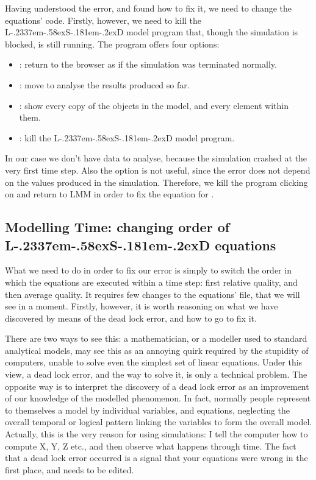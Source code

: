\documentclass [11pt,a4paper] {book}
\def\LsD{{L\kern-.2337em\lower-.58ex\hbox{S}\kern-.181em\lower-.2ex\hbox{D}}\xspace}
\begin{document}
Having understood the error, and found how to fix it, we need to change the equations'
code. Firstly, however, we need to kill the \LsD model program that, though the simulation
is blocked, is still running. The program offers four options:

\begin{itemize}
  \item \menu{Return to \LsD Browser}: return to the browser as if the simulation was terminated normally.
  \item {}: move to analyse the results produced so far.
  \item {}: show every copy of the objects in the model, and every element within them.
  \item \menu{Quit \LsD model program}: kill the \LsD model program.
\end{itemize}

In our case we don't have data to analyse, because the simulation crashed at the very
first time step. Also the  option is not useful, since the error does not
depend on the values produced in the simulation. Therefore, we kill the program clicking
on  and return to LMM in order to fix the equation for .


\subsection{Modelling Time: changing order of \LsD equations}

What we need to do in order to fix our error is simply to switch the order in which the
equations are executed within a time step: first relative quality, and then average
quality. It requires few changes to the equations' file, that we will see in a moment.
Firstly, however, it is worth reasoning on what we have discovered by means of the dead
lock error, and how to go to fix it.

There are two ways to see this: a mathematician, or a modeller used to standard
analytical models, may see this as an annoying quirk required by the stupidity of
computers, unable to solve even the simplest set of linear equations. Under this view, a
dead lock error, and the way to solve it, is only a technical problem. The opposite way
is to interpret the discovery of a dead lock error as an improvement of our knowledge of
the modelled phenomenon. In fact, normally people represent to themselves a model by
individual variables, and equations, neglecting the overall temporal or logical pattern
linking the variables to form the overall model. Actually, this is the very reason for
using simulations: I tell the computer how to compute X, Y, Z etc., and then observe what
happens through time. The fact that a dead lock error occurred is a signal that your
 equations were wrong in the first place, and needs to be edited. 
\end{document}
